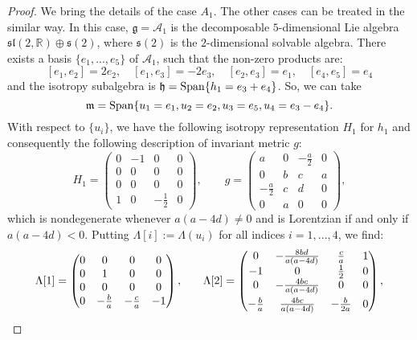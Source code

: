 \documentclass[11pt,oneside,leqno]{amsart}
\theoremstyle{plain}
\begin{document}
\begin{proof}
We bring the details of the case $A_1$. The other cases can be treated in the similar way. In this case, ${{\mathfrak{g}}}={\mathcal A} _1$ is the decomposable $5$-dimensional Lie
algebra $\mathfrak{sl}(2,\mathbb R) \oplus \mathfrak{s} (2)$, where $\mathfrak s (2)$ is the $2$-dimensional solvable algebra. There exists a basis $\{e_1,...,e_5\}$ of ${\mathcal A} _1$, such that the non-zero products are:
$$[e_1,e_2]=2e_2, \quad [e_1,e_3]=-2e_3, \quad [e_2,e_3]=e_1, \quad [e_4,e_5]=e_4$$
and the isotropy subalgebra is ${{\mathfrak{h}}}={\rm Span}\{h_1=e_3+e_4\}$. So, we can take
$${{\mathfrak{m}}}= {\rm Span}\{u_1=e_1,u_2=e_2,u_3=e_5,u_4=e_3-e_4\}.$$
With respect to $\{u_i\}$, we have the following isotropy representation $H_1$ for $h_1$ and consequently the following description of invariant metric $g$:
\begin{equation}\label{gA1}
H_1=\left(\begin{array}{cccc}
0 & -1 & 0 & 0 \\
0 & 0 & 0 & 0 \\
0 & 0 & 0 & 0 \\
1 & 0 & -\frac 12 & 0
\end{array}\right), \qquad g=\left(\begin{array}{cccc}
a & 0 & -\frac{a}{2} & 0 \\
0 & b & c & a \\
-\frac{a}{2} & c & d & 0 \\
0 & a & 0 & 0
\end{array}\right),
\end{equation}
which is nondegenerate whenever $a (a-4d)\neq 0$ and is Lorentzian if and only if $a(a-4d)<0$. Putting $\Lambda[i]:=\Lambda (u_i)$ for all indices $i=1,...,4$, we find:
{\small \begin{align}\label{lambdaA1}
\Lambda[1]=\begin{pmatrix}
0 & 0 & 0 & 0 \\ 0 & 1 & 0 & 0 \\ 0 & 0 & 0 & 0 \\ 0 & -\frac{b}{a} & -\frac{c}{a} & -1\end{pmatrix},  \qquad &\Lambda[2]=\begin{pmatrix}
0 & -\frac{8bd}{a(a - 4d)} & \frac{c}{a} &1 \\ -1 & 0 & \frac 12 & 0 \\ 0 & -\frac{4bc}{a(a - 4d)} & 0 & 0 \\ \noalign{\smallskip} -\frac{b}{a} & \frac{4bc}{a(a - 4d)} & -\frac{b}{2a} & 0\end{pmatrix}, \\

\end{align}}
\end{proof}
\end{document}
